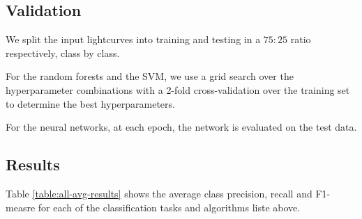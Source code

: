 \documentclass[usenatbib]{mnras}
\begin{document}
\subsection{Validation} \label{subsection_importances}

We split the input lightcurves into training and testing in a $75:25$ ratio respectively, class by class.


For the random forests and the SVM, we use a grid search over the hyperparameter combinations with a 2-fold cross-validation over the training set to determine the best hyperparameters. 

For the neural networks, at each epoch, the network is evaluated on the test data. 


\subsection{Results}

Table \ref{table:all-avg-results} shows the average class precision, recall and F1-measre for each of the classification tasks and algorithms liste above. 
\end{document}
